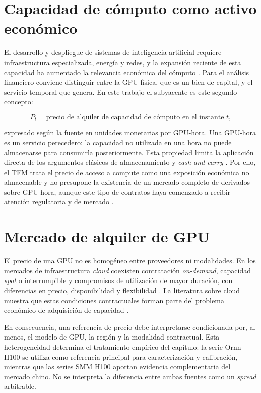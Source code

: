 \section{Capacidad de cómputo como activo económico}
\label{sec:compute_activo_economico}

El desarrollo y despliegue de sistemas de inteligencia artificial requiere
infraestructura especializada, energía y redes, y la expansión reciente de esta
capacidad ha aumentado la relevancia económica del cómputo
\parencite{stanford_ai_index_2026,iea_energy_ai_2025}. Para el análisis financiero
conviene distinguir entre la GPU física, que es un bien de capital, y el servicio
temporal que genera. En este trabajo el subyacente es este segundo concepto:

\begin{equation}
    P_t=\text{precio de alquiler de capacidad de cómputo en el instante }t,
\end{equation}

expresado según la fuente en unidades monetarias por GPU-hora. Una GPU-hora es un
servicio perecedero: la capacidad no utilizada en una hora no puede almacenarse
para consumirla posteriormente. Esta propiedad limita la aplicación directa de
los argumentos clásicos de almacenamiento y \textit{cash-and-carry}
\parencite{bandi_su_2026}. Por ello, el TFM trata el precio de acceso a compute
como una exposición económica no almacenable y no presupone la existencia de un
mercado completo de derivados sobre GPU-hora, aunque este tipo de contratos haya
comenzado a recibir atención regulatoria y de mercado
\parencite{cftc_compute_derivatives_2026}.

\section{Mercado de alquiler de GPU}
\label{sec:mercado_alquiler_gpu}

El precio de una GPU no es homogéneo entre proveedores ni modalidades. En los
mercados de infraestructura \textit{cloud} coexisten contratación
\textit{on-demand}, capacidad \textit{spot} o interrumpible y compromisos de
utilización de mayor duración, con diferencias en precio, disponibilidad y
flexibilidad \parencite{aws_ec2_ondemand,aws_ec2_reserved,google_cloud_spot_vms,
google_cloud_cud}. La literatura sobre cloud muestra que estas condiciones
contractuales forman parte del problema económico de adquisición de capacidad
\parencite{lin_pan_liu_2022}.

En consecuencia, una referencia de precio debe interpretarse condicionada por,
al menos, el modelo de GPU, la región y la modalidad contractual. Esta
heterogeneidad determina el tratamiento empírico del capítulo: la serie Ornn H100
se utiliza como referencia principal para caracterización y calibración, mientras
que las series SMM H100 aportan evidencia complementaria del mercado chino. No se
interpreta la diferencia entre ambas fuentes como un \textit{spread} arbitrable.

